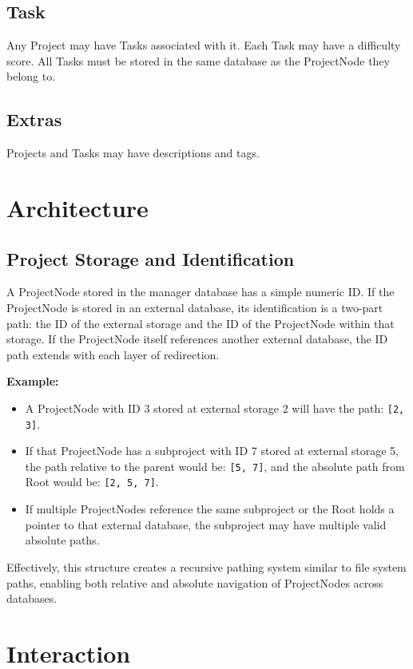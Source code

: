 \documentclass{article}
\begin{document}
\subsection{Task}
Any Project may have Tasks associated with it. Each Task may have a difficulty score. All Tasks must be stored in the same database as the ProjectNode they belong to.

\subsection{Extras}
Projects and Tasks may have descriptions and tags.

\section{Architecture}
\subsection{Project Storage and Identification}
A ProjectNode stored in the manager database has a simple numeric ID. If the ProjectNode is stored in an external database, its identification is a two-part path: the ID of the external storage and the ID of the ProjectNode within that storage. If the ProjectNode itself references another external database, the ID path extends with each layer of redirection.

\textbf{Example:}
\begin{itemize}
    \item A ProjectNode with ID 3 stored at external storage 2 will have the path: \texttt{[2, 3]}.
    \item If that ProjectNode has a subproject with ID 7 stored at external storage 5, the path relative to the parent would be: \texttt{[5, 7]}, and the absolute path from Root would be: \texttt{[2, 5, 7]}.
    \item If multiple ProjectNodes reference the same subproject or the Root holds a pointer to that external database, the subproject may have multiple valid absolute paths.
\end{itemize}

Effectively, this structure creates a recursive pathing system similar to file system paths, enabling both relative and absolute navigation of ProjectNodes across databases.

\section{Interaction}
\end{document}
